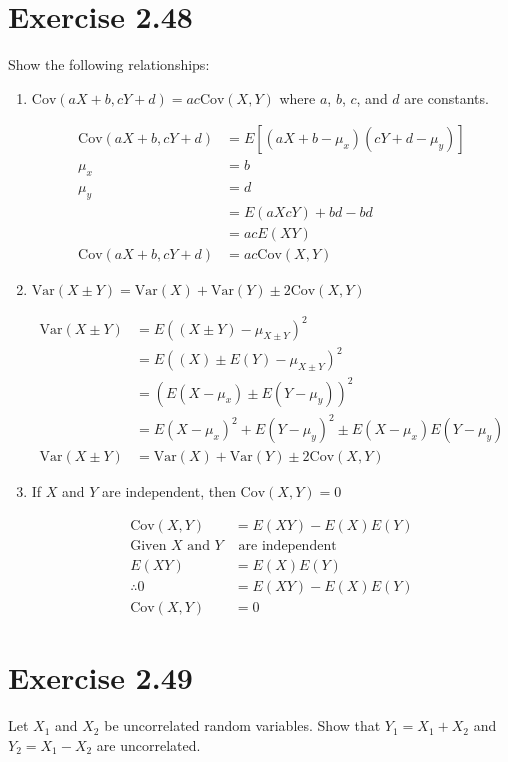 \documentclass{article}
\newcommand{\var}{\text{Var}}
\newcommand{\cov}{\text{Cov}}
\begin{document}
\section*{Exercise 2.48}
Show the following relationships:
\begin{enumerate}[\quad(a)]
	\item $ \cov(aX + b, cY + d) = ac \cov(X,Y) $ where $a$, $b$, $c$, and $d$ are constants.
	
	\begin{align*}
	\cov(aX + b, cY + d) &= E[(aX + b - \mu_x)(cY + d - \mu_y)]\\
	\mu_x &= b\\
	\mu_y &= d\\
	&= E(aXcY) + bd - bd\\
	&= acE(XY)\\
	\cov(aX + b, cY + d) &= ac \cov(X,Y)
	\end{align*}
	\item $ \var(X \pm Y) = \var(X) + \var(Y) \pm 2 \cov(X,Y) $
	
	\begin{align*}
	\var(X \pm Y) &= E((X \pm Y) - \mu_{X\pm Y})^2\\
	&= E((X) \pm E(Y) - \mu_{X\pm Y})^2\\
	&= \left( E(X - \mu_x) \pm E(Y - \mu_y) \right)^2\\
	&= E(X - \mu_x)^2 + E(Y - \mu_y)^2 \pm E(X - \mu_x)E(Y - \mu_y)\\
	\var(X \pm Y) &= \var(X) + \var(Y) \pm 2 \cov(X,Y)
	\end{align*}
	\item If $X$ and $Y$ are independent, then $\cov(X,Y) = 0$ 
	
	\begin{align*}
	\cov(X,Y) &= E(XY) - E(X)E(Y)\\
	\text{Given $X$ and $Y$}&\text{ are independent}\\
	E(XY) &= E(X)E(Y)\\
	\therefore 0 &= E(XY) - E(X)E(Y)\\
	\cov(X,Y) &= 0
	\end{align*}
\end{enumerate}

\section*{Exercise 2.49}

Let $X_1$ and $X_2$ be uncorrelated random variables. Show that $Y_1 = X_1 + X_2$ and $Y_2 = X_1 - X_2$ are uncorrelated.
\end{document}
